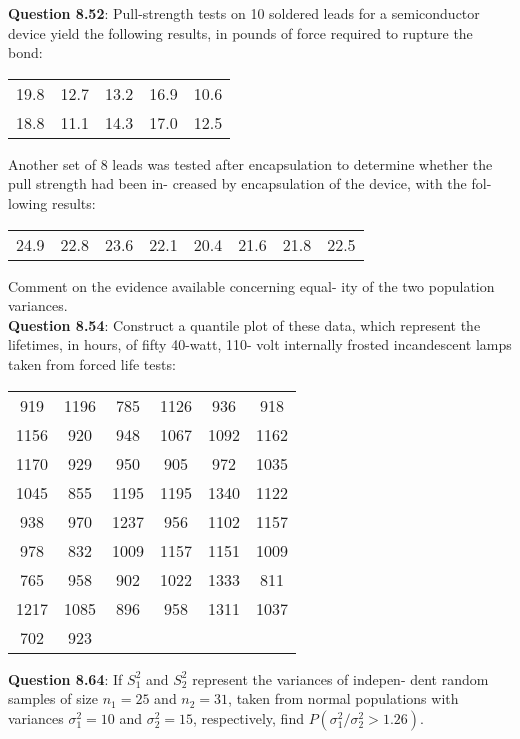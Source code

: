 \documentclass{article}
\begin{document}
    \textbf{Question 8.52}: Pull-strength tests on 10 soldered leads for a
    semiconductor device yield the following results, in
    pounds of force required to rupture the bond:
        \begin{center}
            \begin{tabular}{c c c c c}
                19.8 & 12.7 & 13.2 & 16.9 & 10.6 \\
                18.8 & 11.1 & 14.3 & 17.0 & 12.5
            \end{tabular}
        \end{center}
    Another set of 8 leads was tested after encapsulation
    to determine whether the pull strength had been in-
    creased by encapsulation of the device, with the fol-
    lowing results:
        \begin{center}
            \begin{tabular}{c c c c c c c c}
                24.9 & 22.8 & 23.6 & 22.1 & 20.4 & 21.6 & 21.8 & 22.5
            \end{tabular}
        \end{center}
    Comment on the evidence available concerning equal-
    ity of the two population variances.\\\newline
    \textbf{Question 8.54}: Construct a quantile plot of these data, which
    represent the lifetimes, in hours, of fifty 40-watt, 110-
    volt internally frosted incandescent lamps taken from
    forced life tests:
        \begin{center}
            \begin{tabular}{c c c c c c}
                919 & 1196 & 785 & 1126 & 936 & 918 \\
                1156 & 920 & 948 & 1067 & 1092 & 1162 \\
                1170 & 929 & 950 & 905 & 972 & 1035 \\
                1045 & 855 & 1195 & 1195 & 1340 & 1122 \\
                938 & 970 & 1237 & 956  & 1102 & 1157 \\
                978 & 832 & 1009 & 1157 & 1151 & 1009 \\
                765 & 958 & 902 & 1022 & 1333 & 811 \\ 
                1217 & 1085 & 896 & 958 & 1311 & 1037 \\
                702 & 923
            \end{tabular}
        \end{center}
    \textbf{Question 8.64}: If $S^2_1$ and $S_2^2$ represent the variances of indepen-
    dent random samples of size $n_1 = 25$ and $n_2 = 31$,
    taken from normal populations with variances $\sigma^2_1 = 10$
    and $\sigma_2^2 = 15$, respectively, find $P(\sigma^2_1 / \sigma_2^2 > 1.26)$.
\end{document}
